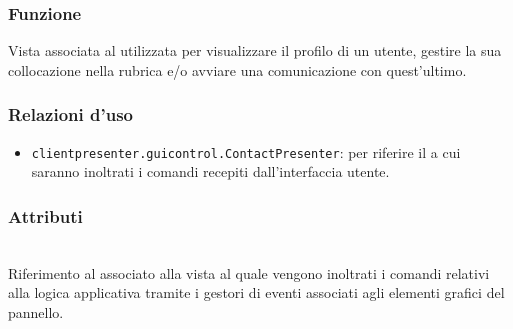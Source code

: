 \subsubsection*{Funzione}
Vista associata al   utilizzata per visualizzare il profilo di un utente, gestire la sua collocazione nella rubrica e/o avviare una comunicazione con quest'ultimo.

\subsubsection*{Relazioni d'uso}
\begin{itemize}
  \item \texttt{clientpresenter.guicontrol.ContactPresenter}: per riferire il  a cui saranno inoltrati i comandi recepiti dall'interfaccia utente.
\end{itemize}

\subsubsection*{Attributi}
\begin{description}
  \item{}\\
  Riferimento al  associato alla vista al quale vengono inoltrati i comandi relativi alla logica applicativa tramite i gestori di eventi associati agli elementi grafici del pannello.
\end{description}

